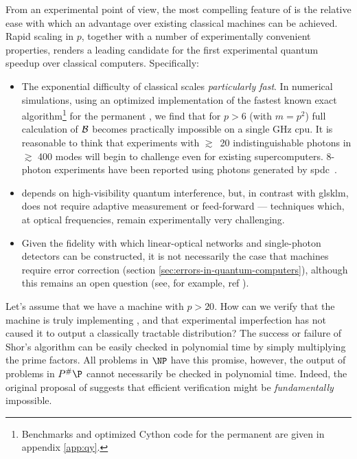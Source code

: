 From an experimental point of view, the most compelling feature of \bosonsampling is the relative ease with which an advantage over existing classical machines can be achieved. 
Rapid scaling in $p$, together with a number of experimentally convenient properties, renders \bosonsampling a leading candidate for the first experimental quantum speedup over classical computers.
Specifically:
\begin{itemize}
    \item The exponential difficulty of classical \bosonsampling scales \emph{particularly fast}. In numerical simulations, using an optimized implementation of the fastest known exact algorithm\footnote{Benchmarks and optimized Cython code for the permanent are given in appendix \ref{app:qy}.} for the permanent \cite{Ryser1963}, we find that for $p>6$ (with $m=p^2$) full calculation of $\mathcal{B}$ becomes practically impossible on a single GHz \gls{cpu}.  It is reasonable to think that experiments with $\gtrsim$~20 indistinguishable photons in $\gtrsim$ 400 modes will begin to challenge even for existing supercomputers. 8-photon experiments have been reported using photons generated by \gls{spdc}~\cite{Yao2012}. 
\item \bosonsampling depends on high-visibility quantum interference, but, in contrast with gls{klm}, does not require adaptive measurement or feed-forward --- techniques which, at optical frequencies, remain experimentally very challenging. %
\item Given the fidelity with which linear-optical networks and single-photon detectors can be constructed, it is not necessarily the case that \bosonsampling machines require error correction (section \ref{sec:errors-in-quantum-computers}), although this remains an open question (see, for example, ref \cite{Leverrier2013}).
\end{itemize}

Let's assume that we have a \bosonsampling machine with $p>20$. How can we verify that the machine is truly implementing \bosonsampling, and that experimental imperfection has not caused it to output a classically tractable distribution?  The success or failure of Shor's algorithm can be easily checked in polynomial time by simply multiplying the prime factors. All problems in $\NP$ have this promise, however, the output of problems in $P^\#\P$ cannot necessarily be checked in polynomial time. Indeed, the original proposal of \bosonsampling suggests that efficient verification might be \emph{fundamentally} impossible. 

